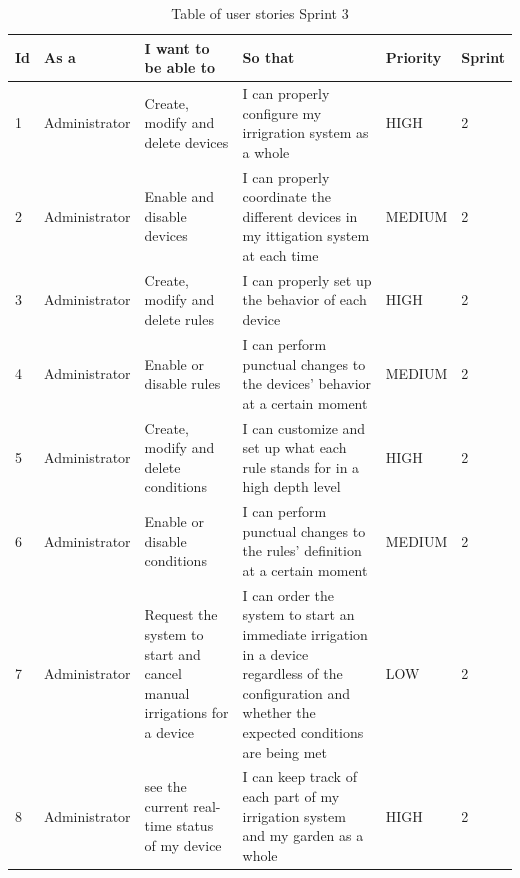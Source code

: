 \documentclass[11pt,a4paper]{article}
\begin{document}
\begin{table}[htbp]
\centering
\begin{adjustbox}{angle=90,width=4.5in}
\begin{tabular}{|l|l|l|p{6cm}|l|l|}
\hline
\textbf{Id} & \textbf{As a} & \textbf{I want to be able to} & \textbf{So that} & \textbf{Priority} & \textbf{Sprint} \\
\hline \hline
1 & Administrator & Create, modify and delete devices & I can properly configure my irrigration system as a whole & HIGH & 2 \\
\hline 
2 & Administrator & Enable and disable devices & I can properly coordinate the different devices in my ittigation system at each time & MEDIUM & 2 \\
\hline
3 & Administrator & Create, modify and delete rules & I can properly set up the behavior of each device & HIGH & 2 \\
\hline
4 & Administrator & Enable or disable rules & I can perform punctual changes to the devices’ behavior at a certain moment & MEDIUM & 2 \\
\hline
5 & Administrator & Create, modify and delete conditions & I can customize and set up what each rule stands for in a high depth level & HIGH & 2 \\
\hline
6 & Administrator &  Enable or disable conditions & I can perform punctual changes to the rules’ definition at a certain moment & MEDIUM & 2 \\
\hline
7 & Administrator & Request the system to start and cancel manual irrigations for a device & I can order the system to start an immediate irrigation in a device regardless of the configuration and whether the expected conditions are being met & LOW & 2 \\
\hline
8 & Administrator & see the current real-time status of my device & I can keep track of each part of my irrigation system and my garden as a whole & HIGH & 2 \\
\hline
\end{tabular}
\end{adjustbox}
\caption{Table of user stories Sprint 3}
\end{table}

\newpage
\end{document}

